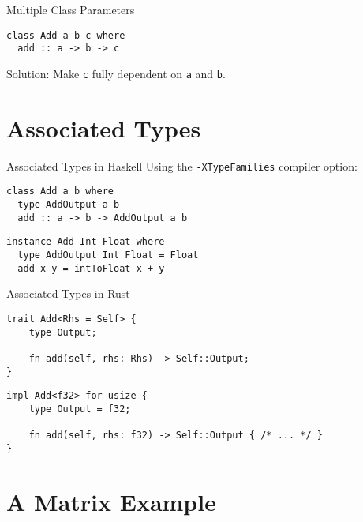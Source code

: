 \documentclass[
  english,            %
  aspectratio=169,    %
]{tumbeamer}
\begin{document}
\begin{frame}[fragile]{Multiple Class Parameters}
\begin{verbatim}
class Add a b c where
  add :: a -> b -> c
\end{verbatim}

\vspace{3mm}

Solution: Make \verb|c| fully dependent on \verb|a| and \verb|b|.
\end{frame}

\section{Associated Types}

\begin{frame}[fragile]{Associated Types in Haskell}
Using the \verb|-XTypeFamilies| compiler option:
\begin{verbatim}
class Add a b where
  type AddOutput a b
  add :: a -> b -> AddOutput a b
\end{verbatim}

\pause \vspace{6mm}

\begin{verbatim}
instance Add Int Float where
  type AddOutput Int Float = Float
  add x y = intToFloat x + y
\end{verbatim}
\end{frame}

\begin{frame}[fragile]{Associated Types in Rust}
\begin{verbatim}
trait Add<Rhs = Self> {
    type Output;

    fn add(self, rhs: Rhs) -> Self::Output;
}
\end{verbatim}

\pause \vspace{3mm}

\begin{verbatim}
impl Add<f32> for usize {
    type Output = f32;

    fn add(self, rhs: f32) -> Self::Output { /* ... */ }
}
\end{verbatim}
\end{frame}

\section{A Matrix Example}
\end{document}
